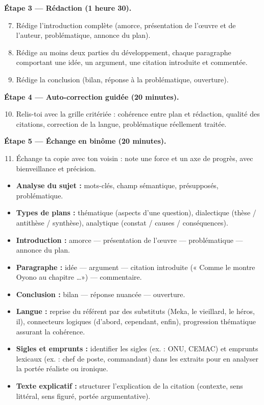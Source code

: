 \documentclass[11pt]{article}
\newcounter{popsec}
\newcounter{popsub}
\newcommand{\courssub}[1]{%
  \stepcounter{popsub}%
  \par\vspace{9pt}\noindent{\popxbold\fontsize{11.5}{13}\selectfont\color{popink}{\color{poporange}\thepopsec.\thepopsub}\hspace{6pt}#1}\par\nopagebreak\vspace{4pt}
}
\begin{document}
\textbf{Étape 3 — Rédaction (1 heure 30).}
\begin{enumerate}
\setcounter{enumi}{6}
\item Rédige l'introduction complète (amorce, présentation de l'œuvre et de l'auteur, problématique, annonce du plan).
\item Rédige au moins deux parties du développement, chaque paragraphe comportant une idée, un argument, une citation introduite et commentée.
\item Rédige la conclusion (bilan, réponse à la problématique, ouverture).
\end{enumerate}

\textbf{Étape 4 — Auto-correction guidée (20 minutes).}
\begin{enumerate}
\setcounter{enumi}{9}
\item Relis-toi avec la grille critériée : cohérence entre plan et rédaction, qualité des citations, correction de la langue, problématique réellement traitée.
\end{enumerate}

\textbf{Étape 5 — Échange en binôme (20 minutes).}
\begin{enumerate}
\setcounter{enumi}{10}
\item Échange ta copie avec ton voisin : note une force et un axe de progrès, avec bienveillance et précision.
\end{enumerate}

\courssub{Ressources à mobiliser}

\begin{aretenir}
\begin{itemize}
\item \textbf{Analyse du sujet :} mots-clés, champ sémantique, présupposés, problématique.
\item \textbf{Types de plans :} thématique (aspects d'une question), dialectique (thèse / antithèse / synthèse), analytique (constat / causes / conséquences).
\item \textbf{Introduction :} amorce — présentation de l'œuvre — problématique — annonce du plan.
\item \textbf{Paragraphe :} idée — argument — citation introduite (« Comme le montre Oyono au chapitre \ldots ») — commentaire.
\item \textbf{Conclusion :} bilan — réponse nuancée — ouverture.
\item \textbf{Langue :} reprise du référent par des substituts (Meka, le vieillard, le héros, il), connecteurs logiques (d'abord, cependant, enfin), progression thématique assurant la cohérence.
\item \textbf{Sigles et emprunts :} identifier les sigles (ex. : ONU, CEMAC) et emprunts lexicaux (ex. : \og{}chef de poste\fg{}, \og{}commandant\fg{}) dans les extraits pour en analyser la portée réaliste ou ironique.
\item \textbf{Texte explicatif :} structurer l'explication de la citation (contexte, sens littéral, sens figuré, portée argumentative).
\end{itemize}
\end{aretenir}
\end{document}
